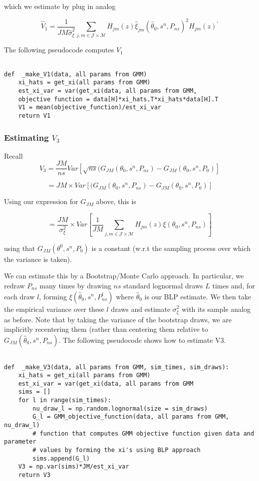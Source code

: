 \documentclass{article}
\begin{document}
\begin{enumerate}
\begin{enumerate}
\begin{answer}
 which we estimate by plug in analog

  $$\hat{V}_1 = \frac{1}{JM \hat \sigma^2_\xi}\sum_{j,m\in \mathcal{J}\times \mathcal{M}} H_{jm}(z)\hat{\xi}_{jm}(\hat\theta_0,s^n,P_{ns})^2 H_{jm}(z)^\prime$$

  The following pseudocode computes $V_1$
\begin{verbatim}

def  _make_V1(data, all params from GMM)
    xi_hats = get_xi(all params from GMM)
    est_xi_var = var(get_xi(data, all params from GMM, 
    objective function = data[H]*xi_hats.T*xi_hats*data[H].T
    V1 = mean(objective_function)/est_xi_var
    return V1
 \end{verbatim}

 \subsubsection*{Estimating $V_3$}

Recall $$V_3 = \frac{JM}{ns}Var[\sqrt{ns} (G_{JM}(\theta_0,s^n,P_{ns})-G_{JM}(\theta_0,s^n,P_0)]$$

$$ = JM \times Var[(G_{JM}(\theta_0,s^n,P_{ns})-G_{JM}(\theta_0,s^n,P_0)] $$

Using our expression for $G_{JM}$ above, this is 

$$ = \frac{JM}{\sigma^2_\xi} \times Var[\frac{1}{JM } \sum_{j,m\in\mathcal{J}\times \mathcal{M}}H_{jm}(z) \xi(\theta_0,s^n,P_{ns})]$$


using that $G_{JM}(\theta^0,s^n,P_0)$ is a constant (w.r.t the sampling process over which the variance is taken).

We can estimate this by a Bootstrap/Monte Carlo approach. In particular, we redraw $P_{ns}$ many times by drawing ${ns}$ standard lognormal draws $L$ times and, for each draw $l$, forming $\xi(\hat{\theta}_0,s^n,P^l_{ns})$ where $\hat{\theta}_0$ is our BLP estimate. We then take the empirical variance over these $l$ draws and estimate $\sigma_{\xi}^2$ with its sample analog as before. Note that by taking the variance of the bootstrap draws, we are implicitly recentering them (rather than centering them relative to $G_{JM}(\hat{\theta}_0,s^n,P_{ns})$. 
 The following pseudocode shows how to estimate V3.
\begin{verbatim}

def  _make_V3(data, all params from GMM, sim_times, sim_draws):
    xi_hats = get_xi(all params from GMM)
    est_xi_var = var(get_xi(data, all params from GMM
    sims = []
    for l in range(sim_times):
        nu_draw_l = np.random.lognormal(size = sim_draws)
        G_l = GMM_objective_function(data, all params from GMM, nu_draw_l) 
        # function that computes GMM objective function given data and parameter 
        # values by forming the xi's using BLP approach 
        sims.append(G_l)
    V3 = np.var(sims)*JM/est_xi_var
    return V3
 \end{verbatim}


\end{answer}
\end{enumerate}
\end{enumerate}
\end{document}
